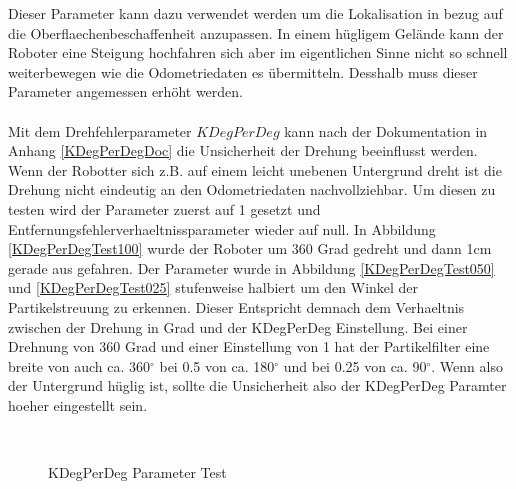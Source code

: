 \documentclass{article}
\begin{document}
Dieser Parameter kann dazu verwendet werden um die Lokalisation in bezug auf die Oberflaechenbeschaffenheit anzupassen. In einem h\"ugligem Gel\"ande kann der Roboter eine Steigung hochfahren sich aber im eigentlichen Sinne nicht so schnell weiterbewegen wie die Odometriedaten es \"ubermitteln. Desshalb muss dieser Parameter angemessen erh\"oht werden.
\\ \\
Mit dem Drehfehlerparameter $KDegPerDeg$ kann nach der Dokumentation in Anhang \ref{KDegPerDegDoc} die Unsicherheit der Drehung beeinflusst werden. Wenn der Robotter sich z.B. auf einem leicht unebenen Untergrund dreht ist die Drehung nicht eindeutig an den Odometriedaten nachvollziehbar. 
Um diesen zu testen wird der Parameter zuerst auf 1 gesetzt und Entfernungsfehlerverhaeltnissparameter wieder auf null.
In Abbildung \ref{KDegPerDegTest100} wurde der Roboter um 360 Grad gedreht und dann 1cm gerade aus gefahren. Der Parameter wurde in Abbildung \ref{KDegPerDegTest050} und \ref{KDegPerDegTest025} stufenweise halbiert um den Winkel der Partikelstreuung zu erkennen. Dieser Entspricht demnach dem Verhaeltnis zwischen der Drehung in Grad und der KDegPerDeg Einstellung. Bei einer Drehnung von 360 Grad und einer Einstellung von 1 hat der Partikelfilter eine breite von auch ca. 360$^\circ$ bei 0.5 von ca. 180$^\circ$ und bei 0.25 von ca. 90$^\circ$. Wenn also der Untergrund h\"uglig ist, sollte die Unsicherheit also der KDegPerDeg Paramter hoeher eingestellt sein. 


\begin{figure}
  \centering
  \ 
  \ 
  \caption{KDegPerDeg Parameter Test}
  \label{KDegPerDegTestFigure}
\end{figure}
\end{document}
